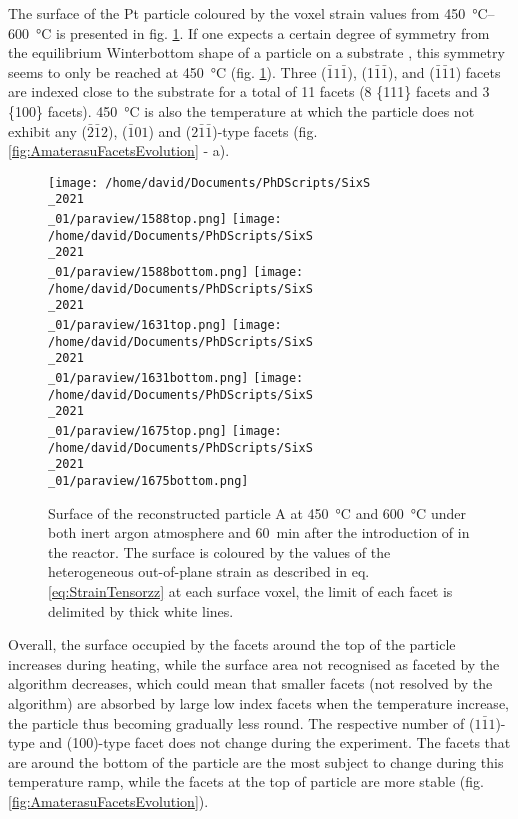 The surface of the Pt particle coloured by the voxel strain values from \qtyrange{450}{600}{\degreeCelsius} is presented in fig. \ref{fig:AmaterasuB}.
If one expects a certain degree of symmetry from the equilibrium Winterbottom shape of a particle on a substrate \parencite{Winterbottom1967, Boukouvala2021}, this symmetry seems to only be reached at \qty{450}{\degreeCelsius} (fig. \ref{fig:AmaterasuB}).
Three ($\bar{1}1\bar{1}$), (1$\bar{1}\bar{1}$), and ($\bar{1}\bar{1}$1) facets are indexed close to the substrate for a total of 11 facets (8 \{111\} facets and 3 \{100\} facets).
\qty{450}{\degreeCelsius} is also the temperature at which the particle does not exhibit any ($\bar{2}\bar{1}2$), ($\bar{1}01$) and ($2\bar{1}\bar{1}$)-type facets (fig. \ref{fig:AmaterasuFacetsEvolution} - a).

\begin{figure}[!htb]
    \centering
    \texttt{[image: /home/david/Documents/PhDScripts/SixS\\\_2021\\\_01/paraview/1588top.png]}
    \texttt{[image: /home/david/Documents/PhDScripts/SixS\\\_2021\\\_01/paraview/1588bottom.png]}
    \texttt{[image: /home/david/Documents/PhDScripts/SixS\\\_2021\\\_01/paraview/1631top.png]}
    \texttt{[image: /home/david/Documents/PhDScripts/SixS\\\_2021\\\_01/paraview/1631bottom.png]}
    \texttt{[image: /home/david/Documents/PhDScripts/SixS\\\_2021\\\_01/paraview/1675top.png]}
    \texttt{[image: /home/david/Documents/PhDScripts/SixS\\\_2021\\\_01/paraview/1675bottom.png]}
    \caption{
        Surface of the reconstructed particle A at \qty{450}{\degreeCelsius} and \qty{600}{\degreeCelsius} under both inert argon atmosphere and \qty{60}{\minute} after the introduction of  in the reactor.
        The surface is coloured by the values of the heterogeneous out-of-plane strain as described in eq. \ref{eq:StrainTensorzz} at each surface voxel, the limit of each facet is delimited by thick white lines.
    }
    \label{fig:AmaterasuB}
\end{figure}

Overall, the surface occupied by the facets around the top of the particle increases during heating, while the surface area not recognised as faceted by the algorithm decreases, which could mean that smaller facets (not resolved by the algorithm) are absorbed by large low index facets when the temperature increase, the particle thus becoming gradually less round.
The respective number of ($1\bar{1}1$)-type and (100)-type facet does not change during the experiment.
The facets that are around the bottom of the particle are the most subject to change during this temperature ramp, while the facets at the top of particle are more stable (fig. \ref{fig:AmaterasuFacetsEvolution}).

